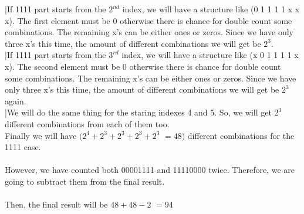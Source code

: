 \documentclass[12pt]{article}
\begin{document}
|If 1111 part starts from the $2^{nd}$ index, we will have a structure like (0 1 1 1 1 x x x). The first element must be 0 otherwise there is chance for double count some combinations. The remaining x's can be  either ones or zeros. Since we have only three x's this time, the amount of different combinations we will get be $2^3$.\\
|If 1111 part starts from the $3^{rd}$ index, we will have a structure like (x 0 1 1 1 1 x x). The second element must be 0 otherwise there is chance for double count some combinations. The remaining x's can be  either ones or zeros. Since we have only three x's this time, the amount of different combinations we will get be $2^3$ again.\\
|We will do the same thing for the staring indexes 4 and 5. So, we will get $2^3$ different combinations from each of them too.\\
Finally we will have $(2^4 + 2^3 + 2^3 + 2^3 + 2^3$ $= 48)$ different combinations for the 1111 case.\\
\\
However, we have counted both 00001111 and 11110000 twice. Therefore, we are going to subtract them from the final result.\\
\\
Then, the final result will be $48 + 48 -2$ $= 94$\\
\end{document}
